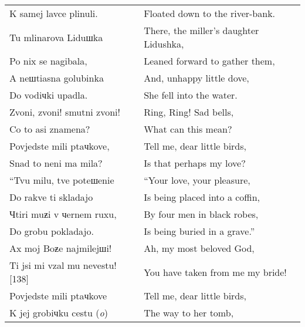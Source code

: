 \begin{small}
\begin{longtable}{ l l }
    \hspace*{0.5cm}K samej lavce plinuli. & \hspace*{0.5cm}Floated down to the river-bank. \\
    Tu mlinarova Liduшka & There, the miller’s daughter Lidushka, \\
    \hspace*{0.5cm}Po nix se nagibala, & \hspace*{0.5cm}Leaned forward to gather them, \\
    A neшtiasna golubinka & And, unhappy little dove, \\
    \hspace*{0.5cm}Do vodiчki upadla. & \hspace*{0.5cm}She fell into the water. \\
    Zvoni, zvoni! smutni zvoni! & Ring, Ring! Sad bells, \\
    \hspace*{0.5cm}Co to asi znamena? & \hspace*{0.5cm}What can this mean? \\
    Povjedste mili ptaчkove, & Tell me, dear little birds, \\
    \hspace*{0.5cm}Snad to neni ma mila? & \hspace*{0.5cm}Is that perhaps my love? \\
    “Tvu milu, tve poteшenie & “Your love, your pleasure, \\
    \hspace*{0.5cm}Do rakve ti skladajo & \hspace*{0.5cm}Is being placed into a coffin, \\
    Чtiri muƶi v чernem ruxu, & By four men in black robes, \\
    \hspace*{0.5cm}Do grobu pokladajo. & \hspace*{0.5cm}Is being buried in a grave.” \\
    Ax moj Boƶe najmilejшi! & Ah, my most beloved God, \\
    \hspace*{0.5cm}Ti jsi mi vzal mu nevestu! [138] & \hspace*{0.5cm}You have taken from me my bride! \\
    Povjedste mili ptaчkove & Tell me, dear little birds, \\
    \hspace*{0.5cm}K jej grobiчku cestu (\textit{o}) & \hspace*{0.5cm}The way to her tomb, \\

\end{longtable}
\end{small}
